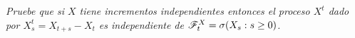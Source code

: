 \emph{
	Pruebe que si $X$ tiene incrementos independientes entonces el proceso $X^t$ dado por $X^t_s=X_{t+s}-X_t$ 
	es independiente de $\mathscr{F}^X_t=\sigma\!\left( X_s:s\geq 0\right) $.
}

\afterstatement\pn